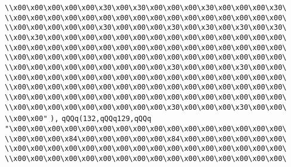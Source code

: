 \verb|\\x00\x00\x00\x00\x00\x30\x00\x30\x00\x00\x00\x30\x00\x00\x00\x30\|\newline
\verb|\\x00\x00\x00\x00\x00\x00\x00\x00\x00\x00\x00\x00\x00\x00\x00\x00\|\newline
\verb|\\x00\x00\x00\x00\x00\x30\x00\x00\x00\x30\x00\x30\x00\x30\x00\x30\|\newline
\verb|\\x00\x30\x00\x00\x00\x00\x00\x00\x00\x00\x00\x00\x00\x00\x00\x00\|\newline
\verb|\\x00\x00\x00\x00\x00\x00\x00\x00\x00\x00\x00\x00\x00\x00\x00\x00\|\newline
\verb|\\x00\x00\x00\x00\x00\x00\x00\x00\x00\x00\x00\x00\x00\x00\x00\x00\|\newline
\verb|\\x00\x00\x00\x00\x00\x00\x00\x00\x00\x30\x00\x00\x00\x30\x00\x00\|\newline
\verb|\\x00\x00\x00\x00\x00\x00\x00\x00\x00\x00\x00\x00\x00\x00\x00\x00\|\newline
\verb|\\x00\x00\x00\x00\x00\x00\x00\x00\x00\x00\x00\x00\x00\x00\x00\x00\|\newline
\verb|\\x00\x00\x00\x00\x00\x00\x00\x00\x00\x00\x00\x00\x00\x00\x00\x00\|\newline
\verb|\\x00\x00\x00\x00\x00\x00\x00\x00\x00\x30\x00\x00\x00\x30\x00\x00\|\newline
\verb|\\x00\x00"|\newline
\verb|),|\newline
\verb|qQQq(132,qQQq129,qQQq|\newline
\verb|"\x00\x00\x00\x00\x00\x00\x00\x00\x00\x00\x00\x00\x00\x00\x00\x00\|\newline
\verb|\\x00\x00\x00\x84\x00\x00\x00\x00\x00\x84\x00\x00\x00\x00\x00\x00\|\newline
\verb|\\x00\x00\x00\x00\x00\x00\x00\x00\x00\x00\x00\x00\x00\x00\x00\x00\|\newline
\verb|\\x00\x00\x00\x00\x00\x00\x00\x00\x00\x00\x00\x00\x00\x00\x00\x00\|\newline
